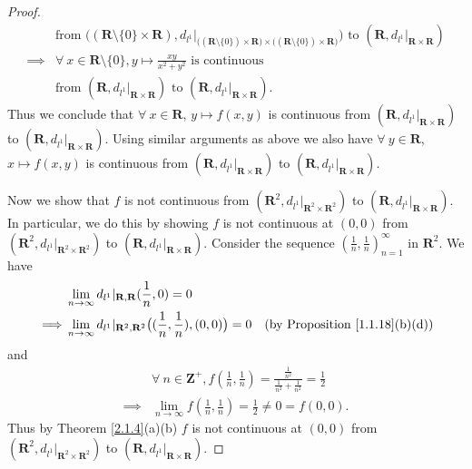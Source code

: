 \begin{proof}
\begin{align*}
                 & \text{from } \big((\mathbf{R} \setminus \{0\} \times \mathbf{R}), d_{l^1}|_{\big((\mathbf{R} \setminus \{0\}) \times \mathbf{R}\big) \times \big((\mathbf{R} \setminus \{0\}) \times \mathbf{R}\big)}\big) \text{ to } (\mathbf{R}, d_{l^1}|_{\mathbf{R} \times \mathbf{R}}) \\
        \implies & \forall\ x \in \mathbf{R} \setminus \{0\}, y \mapsto \frac{xy}{x^2 + y^2} \text{ is continuous}                                                                                                                                                                              \\
                 & \text{from } (\mathbf{R}, d_{l^1}|_{\mathbf{R} \times \mathbf{R}}) \text{ to } (\mathbf{R}, d_{l^1}|_{\mathbf{R} \times \mathbf{R}}).
    \end{align*}
    Thus we conclude that \(\forall\ x \in \mathbf{R}\), \(y \mapsto f(x, y)\) is continuous from \((\mathbf{R}, d_{l^1}|_{\mathbf{R} \times \mathbf{R}})\) to \((\mathbf{R}, d_{l^1}|_{\mathbf{R} \times \mathbf{R}})\).
    Using similar arguments as above we also have \(\forall\ y \in \mathbf{R}\), \(x \mapsto f(x, y)\) is continuous from \((\mathbf{R}, d_{l^1}|_{\mathbf{R} \times \mathbf{R}})\) to \((\mathbf{R}, d_{l^1}|_{\mathbf{R} \times \mathbf{R}})\).

    Now we show that \(f\) is not continuous from \((\mathbf{R}^2, d_{l^1}|_{\mathbf{R}^2 \times \mathbf{R}^2})\) to \((\mathbf{R}, d_{l^1}|_{\mathbf{R} \times \mathbf{R}})\).
    In particular, we do this by showing \(f\) is not continuous at \((0, 0)\) from \((\mathbf{R}^2, d_{l^1}|_{\mathbf{R}^2 \times \mathbf{R}^2})\) to \((\mathbf{R}, d_{l^1}|_{\mathbf{R} \times \mathbf{R}})\).
    Consider the sequence \((\frac{1}{n}, \frac{1}{n})_{n = 1}^\infty\) in \(\mathbf{R}^2\).
    We have
    \begin{align*}
                 & \lim_{n \to \infty} d_{l^1}|_{\mathbf{R}, \mathbf{R}}(\frac{1}{n}, 0) = 0                                                                              \\
        \implies & \lim_{n \to \infty} d_{l^1}|_{\mathbf{R}^2, \mathbf{R}^2}\big((\frac{1}{n}, \frac{1}{n}), (0, 0)\big) = 0 & \text{(by Proposition \ref{1.1.18}(b)(d))}
    \end{align*}
    and
    \begin{align*}
                 & \forall\ n \in \mathbf{Z}^+, f(\frac{1}{n}, \frac{1}{n}) = \frac{\frac{1}{n^2}}{\frac{1}{n^2} + \frac{1}{n^2}} = \frac{1}{2} \\
        \implies & \lim_{n \to \infty} f(\frac{1}{n}, \frac{1}{n}) = \frac{1}{2} \neq 0 = f(0, 0).
    \end{align*}
    Thus by Theorem \ref{2.1.4}(a)(b) \(f\) is not continuous at \((0, 0)\) from \((\mathbf{R}^2, d_{l^1}|_{\mathbf{R}^2 \times \mathbf{R}^2})\) to \((\mathbf{R}, d_{l^1}|_{\mathbf{R} \times \mathbf{R}})\).
\end{proof}

